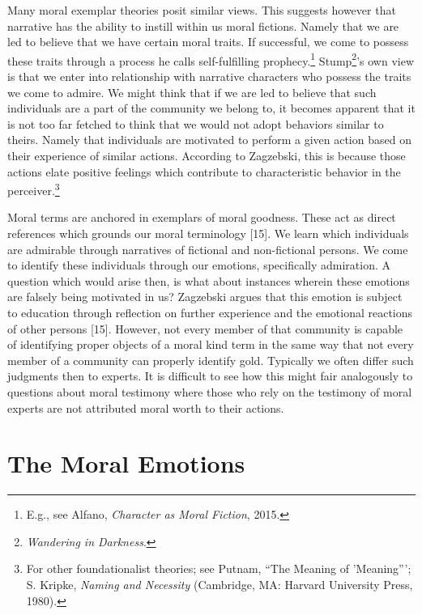 \documentclass[phdthesis,12pt,final,a4paper]{wuthesis}
\theoremstyle{definition}
\theoremstyle{definition}
\theoremstyle{definition}
\theoremstyle{definition}
\theoremstyle{remark}
\begin{document}
Many moral exemplar theories posit similar views. This suggests however that narrative has the ability to instill within us moral fictions. Namely that we are led to believe that we have certain moral traits. If successful, we come to possess these traits through a process he calls self-fulfilling prophecy.\footnote{E.g., see Alfano, \emph{Character as Moral Fiction}, 2015.} Stump\footnote{\emph{Wandering in {Darkness}}.}'s own view is that we enter into relationship with narrative characters who possess the traits we come to admire. We might think that if we are led to believe that such individuals are a part of the community we belong to, it becomes apparent that it is not too far fetched to think that we would not adopt behaviors similar to theirs. Namely that individuals are motivated to perform a given action based on their experience of similar actions. According to Zagzebski, this is because those actions elate positive feelings which contribute to characteristic behavior in the perceiver.\footnote{For other foundationalist theories; see Putnam, {``The {Meaning} of '{Meaning}'''}; S. Kripke, \emph{Naming and Necessity} (Cambridge, MA: Harvard University Press, 1980).}

Moral terms are anchored in exemplars of moral goodness. These act as direct references which grounds our moral terminology {[}15{]}. We learn which individuals are admirable through narratives of fictional and non-fictional persons. We come to identify these individuals through our emotions, specifically admiration. A question which would arise then, is what about instances wherein these emotions are falsely being motivated in us? Zagzebski argues that this emotion is subject to education through reflection on further experience and the emotional reactions of other persons {[}15{]}. However, not every member of that community is capable of identifying proper objects of a moral kind term in the same way that not every member of a community can properly identify gold. Typically we often differ such judgments then to experts. It is difficult to see how this might fair analogously to questions about moral testimony where those who rely on the testimony of moral experts are not attributed moral worth to their actions.

\section{The Moral Emotions}\label{the-moral-emotions}
\end{document}
